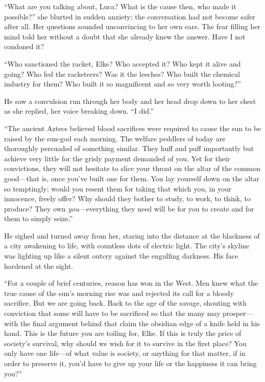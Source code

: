 ``What are you talking about, Luca? What is the cause then, who made it possible?'' she blurted in sudden anxiety; the conversation had not become safer after all. Her questions sounded unconvincing to her own ears. The fear filling her mind told her without a doubt that she already knew the answer. Have I not condoned it?

``Who sanctioned the racket, Elke? Who accepted it? Who kept it alive and going? Who fed the racketeers? Was it the leeches? Who built the chemical industry for them? Who built it so magnificent and so very worth looting?''

He saw a convulsion run through her body and her head drop down to her chest as she replied, her voice breaking down. ``I did.''

``The ancient Aztecs believed blood sacrifices were required to cause the sun to be raised by the sun-god each morning. The welfare peddlers of today are thoroughly persuaded of something similar. They huff and puff importantly but achieve very little for the grisly payment demanded of you. Yet for their convictions, they will not hesitate to slice your throat on the altar of the common good---that is, once you've built one for them. You lay yourself down on the altar so temptingly; would you resent them for taking that which you, in your innocence, freely offer? Why should they bother to study, to work, to think, to produce? They own \emph{you}---everything they need will be for you to create and for them to simply seize.''

He sighed and turned away from her, staring into the distance at the blackness of a city awakening to life, with countless dots of electric light. The city's skyline was lighting up like a silent outcry against the engulfing darkness. His face hardened at the sight.

``For a couple of brief centuries, reason has won in the West. Men knew what the true cause of the sun's morning rise was and rejected its call for a bloody sacrifice. But we are going back. Back to the age of the savage, shouting with conviction that some will have to be sacrificed so that the many may prosper---with the final argument behind that claim the obsidian edge of a knife held in his hand. This is the future you are toiling for, Elke. If this is truly the price of society's survival, why should we wish for it to survive in the first place? You only have one life---of what value is society, or anything for that matter, if in order to preserve it, you'd have to give up your life or the happiness it can bring you?''

